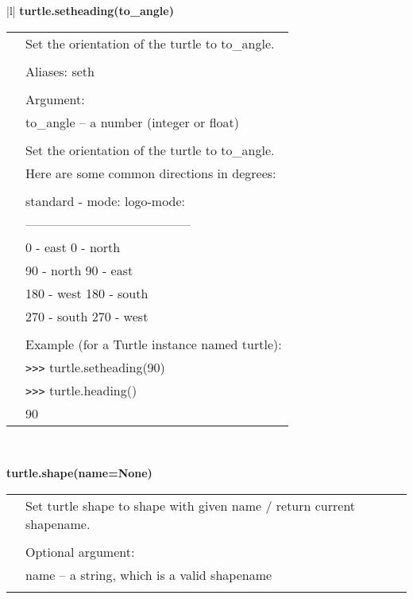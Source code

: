 \begin{center}
{\begin{tabular}{|l|}
{\bf    turtle.setheading(to\_angle)} \\
   \begin{tabular}{p{0.25in}p{4in}}
&        Set the orientation of the turtle to to\_angle. \\
&  \\
&        Aliases:  seth \\
&  \\
&        Argument: \\
&        to\_angle -- a number (integer or float) \\
&  \\
&        Set the orientation of the turtle to to\_angle. \\
&        Here are some common directions in degrees: \\
&  \\
&         standard - mode:          logo-mode: \\
&        --------------------------------------- \\
&           0 - east                0 - north \\
&          90 - north              90 - east \\
&         180 - west              180 - south \\
&         270 - south             270 - west \\
&  \\
&        Example (for a Turtle instance named turtle): \\
&        \verb+>+\verb+>+\verb+>+ turtle.setheading(90) \\
&        \verb+>+\verb+>+\verb+>+ turtle.heading() \\
&        90 \\
\end{tabular} \\ \hline


{\bf    turtle.shape(name=None)} \\
   \begin{tabular}{p{0.25in}p{4in}}
&        Set turtle shape to shape with given name / return current shapename. \\
&  \\
&        Optional argument: \\
&        name -- a string, which is a valid shapename \\
&  \\

\end{tabular} \\ \hline
\end{tabular}}
\end{center}
